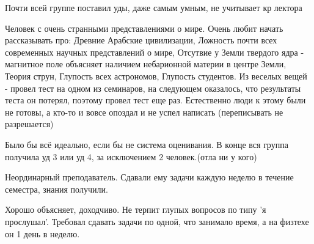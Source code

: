             \begin{commentbox} 
                Почти всей группе поставил уды, даже самым умным, не учитывает кр лектора 
            \end{commentbox} 
        
            \begin{commentbox} 
                Человек с очень странными представлениями о мире. Очень любит начать рассказывать про: Древние Арабские цивилизации, Ложность почти всех современных научных представлений о мире, Отсутвие у Земли твердого ядра - магнитное поле объясняет наличием небарионной материи в центре Земли, Теория струн, Глупость всех астрономов, Глупость студентов. Из веселых вещей - провел тест на одном из семинаров, на следующем оказалось, что результаты теста он потерял, поэтому провел тест еще раз. Естественно люди к этому были не готовы, а кто-то и вовсе опоздал и не успел написать (переписывать не разрешается) 
            \end{commentbox} 
        
            \begin{commentbox} 
                Было бы всё идеально, если бы не система оценивания. В конце вся группа получила уд 3 или уд 4, за исключением 2 человек.(отла ни у кого)  
            \end{commentbox} 
        
            \begin{commentbox} 
                Неординарный преподаватель. Сдавали ему задачи каждую неделю в течение семестра, знания получили. 
            \end{commentbox} 
        
            \begin{commentbox} 
                Хорошо объясняет, доходчиво. Не терпит глупых вопросов по типу 'я прослушал'. Требовал сдавать задачи по одной, что занимало время, а на физтехе он 1 день в неделю. 
            \end{commentbox} 


